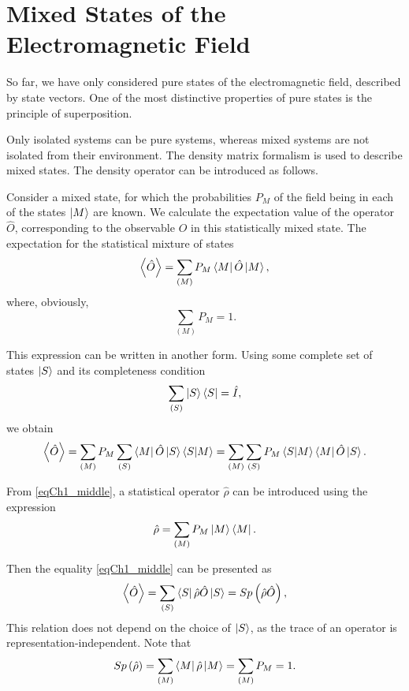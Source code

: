 \section{Mixed States of the Electromagnetic Field}
So far, we have only considered pure states of the electromagnetic field, described by state vectors. One of the most distinctive properties of pure states is the principle of superposition.

Only isolated systems can be pure systems, whereas mixed systems are not isolated from their environment. The density matrix formalism is used to describe mixed states. The density operator can be introduced as follows.

Consider a mixed state, for which the probabilities $P_M$ of the field being in each of the states $\ket{M}$ are known. We calculate the expectation value of the operator $\hat{O}$, corresponding to the observable $O$ in this statistically mixed state. The expectation for the statistical mixture of states  
\begin{equation}
\left<\hat{O}\right> = \sum_{(M)} P_M\bra{M}\hat{O}\ket{M},
\end{equation}
where, obviously, 
\[
\sum_{(M)} P_M = 1.
\]

This expression can be written in another form. Using some complete set of states $\ket{S}$ and its completeness condition 
\[
\sum_{(S)}\ket{S}\bra{S} = \hat{I},
\]
we obtain
\begin{equation}
\left<\hat{O}\right> = \sum_{(M)}
P_M\sum_{(S)}\bra{M}\hat{O}\ket{S}\bra{S}\ket{M}
= \sum_{(M)}\sum_{(S)}P_M\bra{S}\ket{M}\bra{M}\hat{O}\ket{S}.
\label{eqCh1_middle}
\end{equation}

From \eqref{eqCh1_middle}, a statistical operator $\hat{\rho}$ can be introduced using the expression
\begin{equation}
\hat{\rho} = \sum_{(M)}
P_M\ket{M}\bra{M}.
\end{equation}

Then the equality \eqref{eqCh1_middle} can be presented as
\begin{equation}
\left<\hat{O}\right> = \sum_{(S)}
\bra{S}\hat{\rho}\hat{O}\ket{S} = Sp \left(\hat{\rho}\hat{O}\right),
\end{equation}
This relation does not depend on the choice of $\ket{S}$, as the trace of an operator is representation-independent. Note that 
\begin{equation}
Sp \left(\hat{\rho}\right) = \sum_{(M)}
\bra{M}\hat{\rho}\ket{M} = \sum_{(M)} P_M = 1.
\label{eqCh1_spequal1}
\end{equation}

